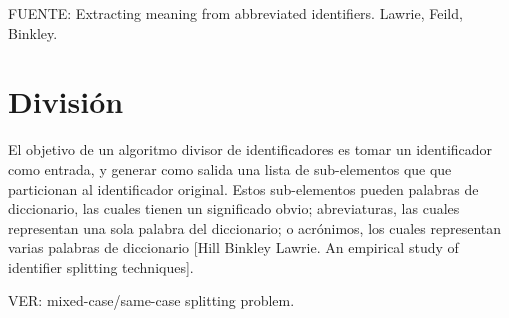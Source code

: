 FUENTE: Extracting meaning from abbreviated identifiers. Lawrie, Feild, Binkley.

\section{División}
El objetivo de un algoritmo divisor de identificadores es tomar un identificador como entrada, y generar como salida
 una lista de sub-elementos que que particionan al identificador original. Estos sub-elementos pueden palabras de diccionario, las cuales tienen un significado obvio; abreviaturas, las cuales representan una sola palabra del diccionario; o acrónimos, los cuales representan varias palabras de diccionario [Hill Binkley Lawrie. An empirical study of identifier splitting techniques].

VER: mixed-case/same-case splitting problem.

